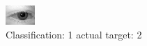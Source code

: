 \begin{figure}[h!]
\begin{center}
\includegraphics[width=0.60\columnwidth]{figures/ID469_class_1_target_2.png}
\end{center}
\caption{ Classification: 1 actual target: 2}
\label{fig:ID469_class_1_target_2}
\end{figure}
